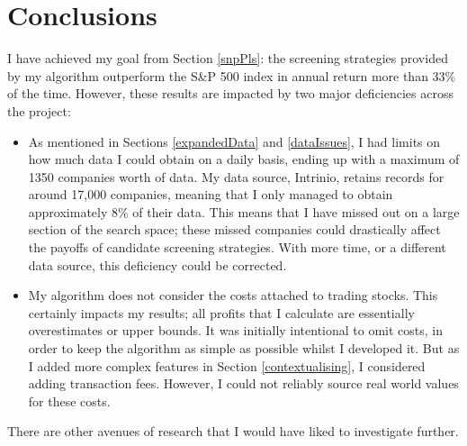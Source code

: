 \section{Conclusions}
I have achieved my goal from Section \ref{snpPls}: the screening strategies provided by my algorithm outperform the S\&P 500 index in annual return more than 33\% of the time. However, these results are impacted by two major deficiencies across the project:

\begin{itemize}
    \item As mentioned in Sections \ref{expandedData} and \ref{dataIssues}, I had limits on how much data I could obtain on a daily basis, ending up with a maximum of 1350 companies worth of data. My data source, Intrinio, retains records for around 17,000 companies, meaning that I only managed to obtain approximately 8\% of their data. This means that I have missed out on a large section of the search space; these missed companies could drastically affect the payoffs of candidate screening strategies. With more time, or a different data source, this deficiency could be corrected.
    \item My algorithm does not consider the costs attached to trading stocks. This certainly impacts my results; all profits that I calculate are essentially overestimates or upper bounds. It was initially intentional to omit costs, in order to keep the algorithm as simple as possible whilst I developed it. But as I added more complex features in Section \ref{contextualising}, I considered adding transaction fees. However, I could not reliably source real world values for these costs.
\end{itemize}

There are other avenues of research that I would have liked to investigate further.

